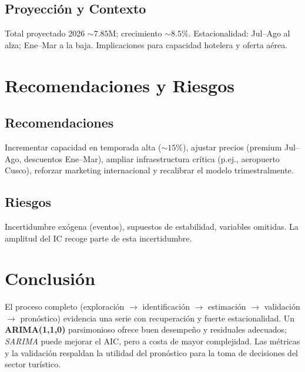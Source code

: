 \documentclass[11pt,a4paper]{article}
\begin{document}
\subsection{Proyección y Contexto}
Total proyectado 2026 $\sim7.85$M; crecimiento $\sim8.5\%$. Estacionalidad: Jul--Ago al alza; Ene--Mar a la baja. Implicaciones para capacidad hotelera y oferta aérea.

\section{Recomendaciones y Riesgos}
\subsection{Recomendaciones}
Incrementar capacidad en temporada alta (\(\sim15\%\)), ajustar precios (premium Jul--Ago, descuentos Ene--Mar), ampliar infraestructura crítica (p.ej., aeropuerto Cusco), reforzar marketing internacional y recalibrar el modelo trimestralmente.

\subsection{Riesgos}
Incertidumbre exógena (eventos), supuestos de estabilidad, variables omitidas. La amplitud del IC recoge parte de esta incertidumbre.

\section{Conclusión}
El proceso completo (exploración $\rightarrow$ identificación $\rightarrow$ estimación $\rightarrow$ validación $\rightarrow$ pronóstico) evidencia una serie con recuperación y fuerte estacionalidad. Un \textbf{ARIMA(1,1,0)} parsimonioso ofrece buen desempeño y residuales adecuados; \textit{SARIMA} puede mejorar el AIC, pero a costa de mayor complejidad. Las métricas y la validación respaldan la utilidad del pronóstico para la toma de decisiones del sector turístico.
\end{document}
